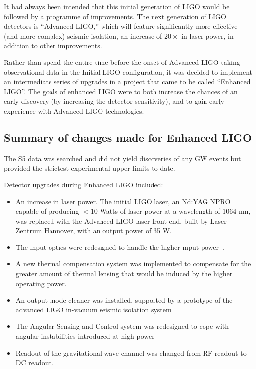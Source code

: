 It had always been intended that this initial generation of LIGO would
be followed by a programme of improvements.  The next generation of
LIGO detectors is ``Advanced LIGO,'' which will feature significantly
more effective (and more complex) seismic isolation, an increase of
$20\times$ in laser power, in addition to other improvements.

Rather than spend the entire time before the onset of Advanced LIGO
taking observational data in the Initial LIGO configuration, it was
decided to implement an intermediate series of upgrades in a project
that came to be called ``Enhanced
LIGO''\cite{Adhikari2006Enhanced,T050252,JoshSmithEnhancedAdvanced}.
The goals of enhanced LIGO were to both increase the chances of an
early discovery (by increasing the detector sensitivity), and to gain
early experience with Advanced LIGO technologies.

\subsection{Summary of changes made for Enhanced LIGO}


The S5 data was searched and did not yield discoveries of any GW
events but provided the strictest experimental upper limits to
date\cite{S5CBCnospin, S5CBC5months, S5burst, S5knownpulsars,
  S5GRB070201, S5NatureStochastic}.

Detector upgrades during Enhanced LIGO included:
\begin{itemize}
\item An increase in laser power.  The initial LIGO laser, an Nd:YAG
  NPRO capable of producing $< 10$ Watts of laser power at a
  wavelength of 1064 nm, was replaced with the Advanced LIGO laser
  front-end, built by Laser-Zentrum Hannover, with an output power of 35 W.
\item The input optics were redesigned to handle the higher input
  power~\cite{DooleyCharacterization,Quetschke2008ElectroOptic}.  
\item A new thermal compensation system was implemented to compensate
  for the greater amount of thermal lensing that would be induced by
  the higher operating power.
\item An output mode cleaner was installed, supported by a prototype
  of the advanced LIGO in-vacuum seismic isolation system~\cite{KisselThesis}
\item The Angular Sensing and Control system was redesigned to cope
  with angular instabilities introduced at high
  power~\cite{Sidles2006Optical,DooleyAngular}
\item Readout of the gravitational wave channel was changed from RF
  readout to DC readout.
\end{itemize}

